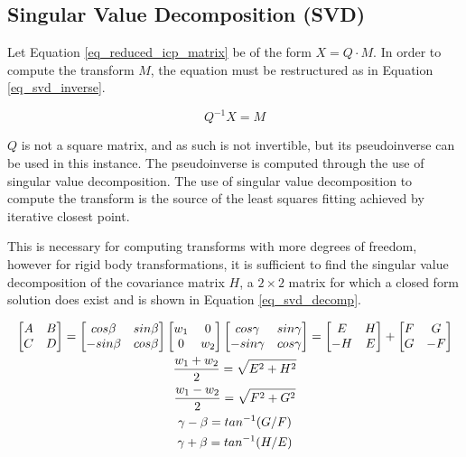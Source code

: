 \documentclass[sigconf]{acmart}
\begin{document}
\subsection{Singular Value Decomposition (SVD)}

Let Equation \ref{eq_reduced_icp_matrix} be of the form $X=Q \cdot M$. In order to compute the transform $M$, the equation must be restructured as in Equation \ref{eq_svd_inverse}.

\begin{equation}
Q^{-1} X = M
\label{eq_svd_inverse}
\end{equation}

$Q$ is not a square matrix, and as such is not invertible, but its pseudoinverse can be used in this instance. The pseudoinverse is computed through the use of singular value decomposition. The use of singular value decomposition to compute the transform is the source of the least squares fitting achieved by iterative closest point.

This is necessary for computing transforms with more degrees of freedom, however for rigid body transformations, it is sufficient to find the singular value decomposition of the covariance matrix $H$, a $2 \times 2$ matrix for which a closed form solution does exist\cite{blinn_consider_1996} and is shown in Equation \ref{eq_svd_decomp}.

\begin{equation}
\resizebox{\columnwidth}{!} {$
\begin{gathered}
	\begin{bmatrix}
	A & B \\
	C & D
	\end{bmatrix}
	=
	\begin{bmatrix}
	cos\beta & sin\beta \\
	-sin\beta & cos\beta
	\end{bmatrix}
	\begin{bmatrix}
	w_1 & 0 \\
	0 & w_2
	\end{bmatrix}
	\begin{bmatrix}
	cos\gamma & sin\gamma \\
	-sin\gamma & cos\gamma
	\end{bmatrix}
	=
	\begin{bmatrix}
	E & H \\
	-H & E
	\end{bmatrix}
	+
	\begin{bmatrix}
	F & G \\
	G & -F
	\end{bmatrix}
	\\
	\frac{w_1 + w_2}{2} = \sqrt{E^2 + H^2}
	\\
	\frac{w_1 - w_2}{2} = \sqrt{F^2 + G^2}
	\\
	\gamma - \beta = tan^{-1}(G/F)
	\\
	\gamma + \beta = tan^{-1}(H/E)
\end{gathered}
$}
\label{eq_svd_decomp}
\end{equation}
\end{document}

